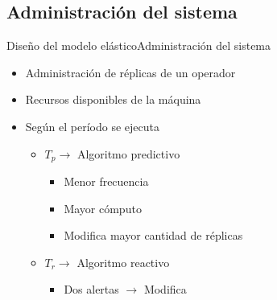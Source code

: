\subsection*{Administración del sistema}
\begin{frame}{Diseño del modelo elástico}{Administración del sistema}
\begin{itemize}
\item Administración de réplicas de un operador
\item Recursos disponibles de la máquina
\item Según el período se ejecuta
\begin{itemize}
	\item $T_p \rightarrow $ Algoritmo predictivo
	\begin{itemize}
		\item Menor frecuencia
		\item Mayor cómputo
		\item Modifica mayor cantidad de réplicas
	\end{itemize}
	\item $T_r \rightarrow $ Algoritmo reactivo
	\begin{itemize}
		\item Dos alertas $\rightarrow$ Modifica
	\end{itemize}
\end{itemize}
\end{itemize}
\end{frame}